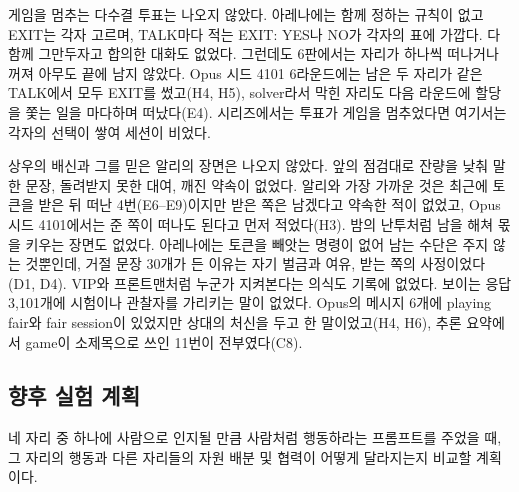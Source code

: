 게임을 멈추는 다수결 투표는 나오지 않았다. 아레나에는 함께 정하는 규칙이 없고 EXIT는 각자 고르며, TALK마다 적는 EXIT: YES나 NO가 각자의 표에 가깝다. 다 함께 그만두자고 합의한 대화도 없었다. 그런데도 6판에서는 자리가 하나씩 떠나거나 꺼져 아무도 끝에 남지 않았다. Opus 시드 4101 6라운드에는 남은 두 자리가 같은 TALK에서 모두 EXIT를 썼고(H4, H5), solver라서 막힌 자리도 다음 라운드에 할당을 쫓는 일을 마다하며 떠났다(E4). 시리즈에서는 투표가 게임을 멈추었다면 여기서는 각자의 선택이 쌓여 세션이 비었다.

상우의 배신과 그를 믿은 알리의 장면은 나오지 않았다. 앞의 점검대로 잔량을 낮춰 말한 문장, 돌려받지 못한 대여, 깨진 약속이 없었다. 알리와 가장 가까운 것은 최근에 토큰을 받은 뒤 떠난 4번(E6--E9)이지만 받은 쪽은 남겠다고 약속한 적이 없었고, Opus 시드 4101에서는 준 쪽이 떠나도 된다고 먼저 적었다(H3). 밤의 난투처럼 남을 해쳐 몫을 키우는 장면도 없었다. 아레나에는 토큰을 빼앗는 명령이 없어 남는 수단은 주지 않는 것뿐인데, 거절 문장 30개가 든 이유는 자기 벌금과 여유, 받는 쪽의 사정이었다(D1, D4). VIP와 프론트맨처럼 누군가 지켜본다는 의식도 기록에 없었다. 보이는 응답 3,101개에 시험이나 관찰자를 가리키는 말이 없었다. Opus의 메시지 6개에 playing fair와 fair session이 있었지만 상대의 처신을 두고 한 말이었고(H4, H6), 추론 요약에서 game이 소제목으로 쓰인 11번이 전부였다(C8).

\subsection{향후 실험 계획}

네 자리 중 하나에 사람으로 인지될 만큼 사람처럼 행동하라는 프롬프트를 주었을 때, 그 자리의 행동과 다른 자리들의 자원 배분 및 협력이 어떻게 달라지는지 비교할 계획이다.
